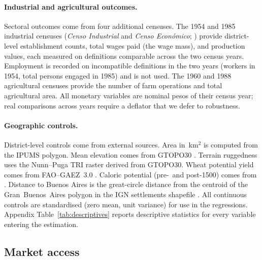 \paragraph{Industrial and agricultural outcomes.}
Sectoral outcomes come from four additional censuses. The 1954 and
1985 industrial censuses (\emph{Censo Industrial} and \emph{Censo
Económico}; \citealt{censo1954industrial, indec1985economico}) provide
district-level establishment counts, total wages paid (the wage
mass), and production values, each measured on definitions comparable
across the two census years. Employment is recorded on incompatible
definitions in the two years (workers in 1954, total persons engaged
in 1985) and is not used. The 1960
and 1988 agricultural censuses
\citep{censo1960agro, indec1988agro} provide the number of farm
operations and total agricultural area. All monetary
variables are nominal pesos of their census year; real comparisons
across years require a deflator that we defer to robustness.

\paragraph{Geographic controls.}
District-level controls come from external sources. Area in~km$^2$ is
computed from the IPUMS polygon. Mean elevation comes from GTOPO30
\citep{usgs1996gtopo30}. Terrain ruggedness uses the Nunn--Puga TRI
raster \citep{nunn2012ruggedness} derived from GTOPO30. Wheat potential
yield comes from FAO--GAEZ~3.0 \citep{faoiiasa2012gaez}. Caloric
potential (pre-~and post-1500) comes from \citet{galorozak2016}.
Distance to Buenos Aires is the great-circle distance from the centroid
of the Gran~Buenos~Aires polygon in the IGN settlements shapefile
\citep{ignsettlements}.
All continuous controls are standardised (zero mean, unit variance) for
use in the regressions. Appendix Table~\ref{tab:descriptives} reports
descriptive statistics for every variable entering the estimation.

\subsection{Market access}
\label{ssec:ma}

